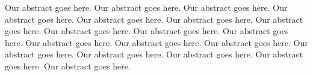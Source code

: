 
\noindent
{Our abstract goes here. Our abstract goes here. Our abstract goes here. Our abstract goes here. Our abstract goes here. Our abstract goes here. Our abstract goes here. Our abstract goes here. Our abstract goes here. Our abstract goes here. Our abstract goes here. Our abstract goes here. Our abstract goes here. Our abstract goes here. Our abstract goes here. Our abstract goes here. Our abstract goes here. Our abstract goes here.}